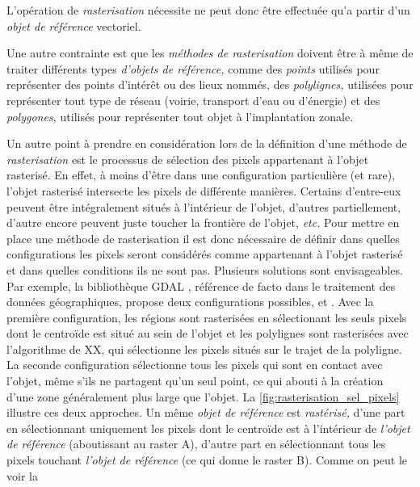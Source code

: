L'opération de \emph{rasterisation} nécessite ne peut
donc être effectuée qu'a partir d'un \emph{objet de référence}
vectoriel.

Une autre contrainte est que les \emph{méthodes de rasterisation}
doivent être à même de traiter différents types \emph{d'objets de
  référence,} comme des \emph{points} utilisés pour représenter des
points d’intérêt ou des lieux nommés, des \emph{polylignes,} utilisées
pour représenter tout type de réseau (\eg voirie, transport d'eau ou
d'énergie) et des \emph{polygones,} utilisés pour représenter tout
objet à l’implantation zonale.

Un autre point à prendre en considération lors de la définition d'une
méthode de \emph{rasterisation} est le processus de sélection des
pixels appartenant à l'objet rasterisé. En effet, à moins d’être dans
une configuration particulière (et rare), l'objet rasterisé intersecte
les pixels de différente manières. Certains d'entre-eux peuvent être
intégralement situés à l'intérieur de l'objet, d'autres partiellement,
d'autre encore peuvent juste toucher la frontière de l'objet,
\emph{etc.} Pour mettre en place une méthode de rasterisation il est
donc nécessaire de définir dans quelles configurations les pixels
seront considérés comme appartenant à l'objet rasterisé et dans
quelles conditions ils ne sont pas. Plusieurs solutions sont
envisageables. Par exemple, la bibliothèque GDAL \autocite{GDAL2020},
référence de facto dans le traitement des données géographiques,
propose deux configurations possibles,
 et
. Avec la première
configuration, les régions sont rasterisées en sélectionant les seuls
pixels dont le centroïde est situé au sein de l'objet et les
polylignes sont rasterisées avec l'algorithme de XX, qui sélectionne
les pixels situés sur le trajet de la polyligne. La seconde
configuration sélectionne tous les pixels qui sont en contact avec
l'objet, même s'ils ne partagent qu'un seul point, ce qui abouti à la
création d'une zone généralement plus large que l'objet. La
\autoref{fig:rasterisation_sel_pixels} illustre ces deux approches. Un
même \emph{objet de référence} est \emph{rastérisé,} d'une part en
sélectionnant uniquement les pixels dont le centroïde est à
l'intérieur de \emph{l'objet de référence} (aboutissant au raster
\textcolor{RdBu-9-1}{\textsf{A}}), d'autre part en sélectionnant tous
les pixels touchant \emph{l'objet de référence} (ce qui donne le
raster \textcolor{RdBu-9-9}{\textsf{B}}). Comme on peut le voir la
